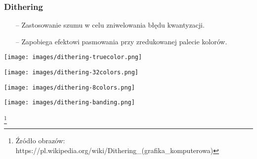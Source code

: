 \documentclass[usenames,dvipsnames,aspectratio=43,presentation]{beamer}
\begin{document}
    \begin{frame}
        \frametitle{Dithering}
        \footnotesize

        \begin{itemize}
            \item[--] Zastosowanie szumu w celu zniwelowania błędu kwantyzacji.
            \item[--] Zapobiega efektowi pasmowania przy zredukowanej palecie kolorów.
        \end{itemize}
        
        \vfill
        
        \begin{minipage}{\textwidth}
            \centering

            \texttt{[image: images/dithering-truecolor.png]}

            \texttt{[image: images/dithering-32colors.png]}

            \texttt{[image: images/dithering-8colors.png]}

            \texttt{[image: images/dithering-banding.png]}
        \end{minipage}

        \let\thefootnote\relax\footnote[frame]{
            \tiny
            \hspace{-3.25em}
            Źródło obrazów:
            https://pl.wikipedia.org/wiki/Dithering_(grafika_komputerowa)
        }
    \end{frame}
\end{document}
